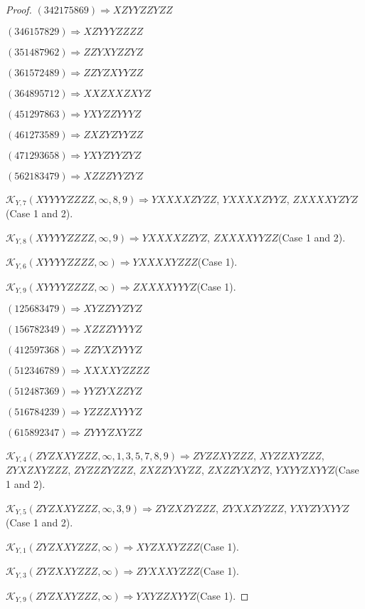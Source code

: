 \documentclass[12pt]{article}
\theoremstyle{plain}
\theoremstyle{definition}
\theoremstyle{remark}
\newcommand{\fancy}[1]{\mathcal{#1}}
\def\K{\fancy{K}}
\begin{document}
\begin{proof}
	$(3 4 2 1 7 5 8 6 9)\Rightarrow XZYYZZYZZ$
	
	$(3 4 6 1 5 7 8 2 9)\Rightarrow XZYYYZZZZ$
	
	$(3 5 1 4 8 7 9 6 2)\Rightarrow ZZYXYZZYZ$
	
	$(3 6 1 5 7 2 4 8 9)\Rightarrow ZZYZXYYZZ$
	
	$(3 6 4 8 9 5 7 1 2)\Rightarrow XXZXXZXYZ$
	
	$(4 5 1 2 9 7 8 6 3)\Rightarrow YXYZZYYYZ$
	
	$(4 6 1 2 7 3 5 8 9)\Rightarrow ZXZYZYYZZ$
	
	$(4 7 1 2 9 3 6 5 8)\Rightarrow YXYZYYZYZ$
	
	$(5 6 2 1 8 3 4 7 9)\Rightarrow XZZZYYZYZ$
	
	
	
	$\K_{Y,7}(XYYYYZZZZ,\infty,8, 9)\Rightarrow $$YXXXXZYZZ$, $YXXXXZYYZ$, $ZXXXXYZYZ$(Case 1 and 2).
	
	$\K_{Y,8}(XYYYYZZZZ,\infty,9)\Rightarrow $$YXXXXZZYZ$, $ZXXXXYYZZ$(Case 1 and 2).
	
	$\K_{Y,6}(XYYYYZZZZ,\infty)\Rightarrow $$YXXXXYZZZ$(Case 1).
	
	$\K_{Y,9}(XYYYYZZZZ,\infty)\Rightarrow $$ZXXXXYYYZ$(Case 1).
	
	
	
	$(1 2 5 6 8 3 4 7 9)\Rightarrow XYZZYYZYZ$
	
	$(1 5 6 7 8 2 3 4 9)\Rightarrow XZZZYYYYZ$
	
	$(4 1 2 5 9 7 3 6 8)\Rightarrow ZZYXZYYYZ$
	
	$(5 1 2 3 4 6 7 8 9)\Rightarrow XXXXYZZZZ$
	
	$(5 1 2 4 8 7 3 6 9)\Rightarrow YYZYXZZYZ$
	
	$(5 1 6 7 8 4 2 3 9)\Rightarrow YZZZXYYYZ$
	
	$(6 1 5 8 9 2 3 4 7)\Rightarrow ZYYYZXYZZ$
	
	
	
	$\K_{Y,4}(ZYZXXYZZZ,\infty,1, 3, 5, 7, 8, 9)\Rightarrow $$ZYZZXYZZZ$, $XYZZXYZZZ$, $ZYXZXYZZZ$, $ZYZZZYZZZ$, $ZXZZYXYZZ$, $ZXZZYXZYZ$, $YXYYZXYYZ$(Case 1 and 2).
	
	$\K_{Y,5}(ZYZXXYZZZ,\infty,3, 9)\Rightarrow $$ZYZXZYZZZ$, $ZYXXZYZZZ$, $YXYZYXYYZ$(Case 1 and 2).
	
	$\K_{Y,1}(ZYZXXYZZZ,\infty)\Rightarrow $$XYZXXYZZZ$(Case 1).
	
	$\K_{Y,3}(ZYZXXYZZZ,\infty)\Rightarrow $$ZYXXXYZZZ$(Case 1).
	
	$\K_{Y,9}(ZYZXXYZZZ,\infty)\Rightarrow $$YXYZZXYYZ$(Case 1).
	

\end{proof}
\end{document}
